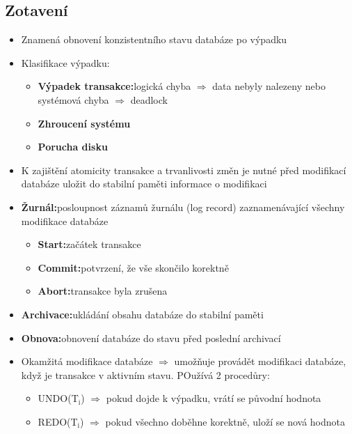 \documentclass[a4paper,10pt]{article}
\newcommand{\pojem}[2]{\item \textbf{#1:}\quad #2}
\newcommand{\tedy}{$\Rightarrow$ }
\begin{document}
		\subsection{Zotavení}
			\begin{itemize}
				\item Znamená obnovení konzistentního stavu databáze po výpadku
				\item Klasifikace výpadku:
				\begin{itemize}
					\pojem{Výpadek transakce}{logická chyba \tedy data nebyly nalezeny nebo systémová chyba \tedy deadlock}
					\item \textbf{Zhroucení systému}
					\item \textbf{Porucha disku}
				\end{itemize}
				\item K zajištění atomicity transakce a trvanlivosti změn je nutné před modifikací databáze uložit do stabilní paměti informace o modifikaci
				\pojem{Žurnál}{posloupnost záznamů žurnálu (log record) zaznamenávající všechny modifikace databáze}
				\begin{itemize}
					\pojem{Start}{začátek transakce}
					\pojem{Commit}{potvrzení, že vše skončilo korektně}
					\pojem{Abort}{transakce byla zrušena}
				\end{itemize}
				\pojem{Archivace}{ukládání obsahu databáze do stabilní paměti}
				\pojem{Obnova}{obnovení databáze do stavu před poslední archivací}
				\item Okamžitá modifikace databáze \tedy umožňuje provádět modifikaci databáze, když je transakce v aktivním stavu. POužívá 2 procedůry:
				\begin{itemize}
					\item UNDO(T$_\textrm{i}$) \tedy pokud dojde k výpadku, vrátí se původní hodnota
					\item REDO(T$_\textrm{i}$) \tedy pokud všechno doběhne korektně, uloží se nová hodnota
				\end{itemize}
			\end{itemize}
			\begin{figure}[h!]
				\centering
			\end{figure}
\end{document}
